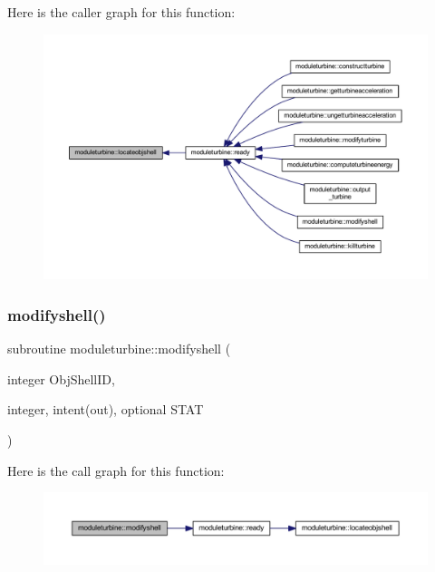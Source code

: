 Here is the caller graph for this function\+:\nopagebreak
\begin{figure}[H]
\begin{center}
\leavevmode
\includegraphics[width=350pt]{namespacemoduleturbine_ad69845ea1216f04acc515267e6a71770_icgraph}
\end{center}
\end{figure}
\mbox{\label{namespacemoduleturbine_a1d4106d55d966d87476e3ddbb2fc33b0}} 
\subsubsection{\texorpdfstring{modifyshell()}{modifyshell()}}
{\footnotesize\ttfamily subroutine moduleturbine\+::modifyshell (\begin{DoxyParamCaption}\item[{integer}]{Obj\+Shell\+ID,  }\item[{integer, intent(out), optional}]{S\+T\+AT }\end{DoxyParamCaption})\hspace{0.3cm}{\ttfamily [private]}}

Here is the call graph for this function\+:\nopagebreak
\begin{figure}[H]
\begin{center}
\leavevmode
\includegraphics[width=350pt]{namespacemoduleturbine_a1d4106d55d966d87476e3ddbb2fc33b0_cgraph}
\end{center}
\end{figure}
\mbox{\label{namespacemoduleturbine_a91250e475b9a5222abdd834b760515c6}} 
